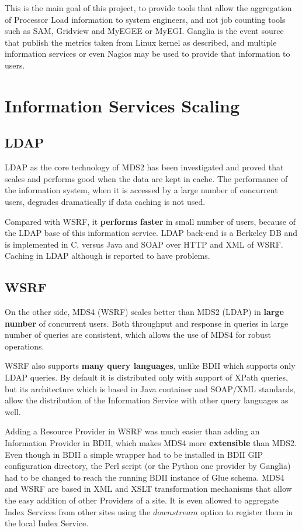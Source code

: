 This is the main goal of this project, to provide tools that allow the aggregation of Processor Load information to system engineers, and not job counting tools such as \ac{SAM}, Gridview and MyEGEE or MyEGI. Ganglia is the event source that publish the metrics taken from Linux kernel as described, and multiple information services or even Nagios may be used to provide that information to users.

\section{Information Services Scaling}

\subsection{LDAP}

LDAP as the core technology of MDS2 has been investigated \cite{zhang2004performance} and proved that scales and performs good when the data are kept in cache. The performance of the information system, when it is accessed by a large number of concurrent users, degrades dramatically if data caching is not used.

Compared with WSRF, it {\bf performs faster} \cite{schopf2006monitoring} in small number of users, because of the LDAP base of this information service. LDAP back-end is a Berkeley DB and is implemented in C, versus Java and SOAP over HTTP and XML of WSRF. Caching in LDAP although is reported to have problems.

\subsection{WSRF}

On the other side, MDS4 (WSRF) scales better than MDS2 (LDAP) in {\bf large number} of concurrent users. Both throughput and response in queries in large number of queries are consistent, which allows the use of MDS4 for robust operations.

WSRF also supports {\bf many query languages}, unlike BDII which supports only LDAP queries. By default it is distributed only with support of XPath queries, but its architecture which is based in Java container and SOAP/XML standards, allow the distribution of the Information Service with other query languages as well.

Adding a Resource Provider in WSRF was much easier than adding an Information Provider in BDII, which makes MDS4 more {\bf extensible} than MDS2. Even though in BDII a simple wrapper had to be installed in BDII \ac{GIP} configuration directory, the Perl script (or the Python one provider by Ganglia) had to be changed to reach the running BDII instance of Glue schema. MDS4 and WSRF are based in XML and XSLT transformation mechanisms that allow the easy addition of other Providers of a site. It is even allowed to aggregate Index Services from other sites using the $downstream$ option to register them in the local Index Service.

